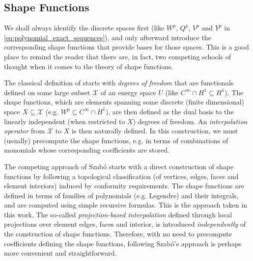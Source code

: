 
\subsection{Shape Functions}
We shall always identify the discrete spaces first (like $W^p$, $Q^p$, $V^p$ and $Y^p$ in \eqref{eq:polynomial_exact_sequences}), and only afterward introduce the corresponding shape functions that provide bases for those spaces.
This is a good place to remind the reader that there are, in fact, two competing schools of thought when it comes to the theory of shape functions.

The classical definition of \citet{Ciarlet} starts with \textit{degrees of freedom} that are functionals defined on some large subset $\mathcal{X}$ of an energy space $U$ (like $C^\infty\cap H^1\subseteq H^1$). 
The shape functions, which are elements spanning some discrete (finite dimensional) space $X\subseteq\mathcal{X}$ (e.g. $W^p\subseteq C^\infty\cap H^1$), are then defined as the dual basis to the linearly independent (when restricted to $X$) degrees of freedom.
An \textit{interpolation operator} from $\mathcal{X}$ to $X$ is then naturally defined.
In this construction, we must (usually) precompute the shape functions, e.g. in terms of combinations of monomials whose corresponding coefficients are stored.


The competing approach of Szab\'o \citep{SzaboBabuska91} starts with a direct construction of shape functions by following a topological classification (of vertices, edges, faces and element interiors) induced by conformity requirements.
The shape functions are defined in terms of families of polynomials (e.g. Legendre) and their integrals, and are computed using simple recursive formulas. This is the approach taken in this work.
The so-called \textit{projection-based interpolation} \citep{hpbook,hpbook2} defined through local projections over element edges, faces and interior, is introduced \textit{independently} of the construction of shape functions.
Therefore, with no need to precompute coefficients defining the shape functions, following Szab\'o's approach is perhaps more convenient and straightforward.

